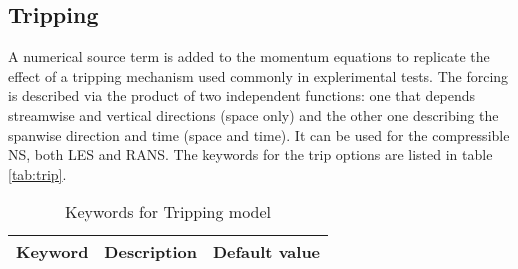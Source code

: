 \documentclass[a4paper,10pt]{report}
\begin{document}
\subsection{Tripping}

A numerical source term is added to the momentum equations to replicate the effect of a tripping mechanism used commonly in explerimental tests. The forcing is described via the product of two independent functions: one that depends streamwise and vertical directions (space only) and the other one describing the spanwise direction and time (space and time).
It can be used for the compressible NS, both LES and RANS.
The keywords for the trip options are listed in table \ref{tab:trip}.

\begin{table}[htbp]
\caption{Keywords for Tripping model}
\begin{tabular}{|l|p{10cm}|p{2.2cm}|}
\hline
\multicolumn{1}{|c|}{Keyword} & \multicolumn{1}{c|}{Description} & \multicolumn{1}{c|}{Default value} \\ \hline


\end{tabular}
\end{table}
\end{document}
